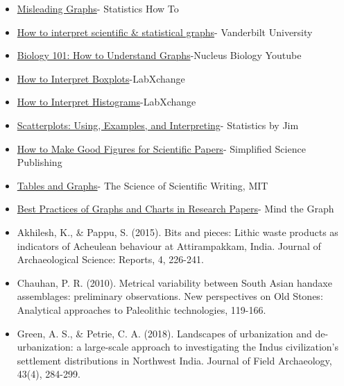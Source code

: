 \documentclass{article}
\begin{document}
\begin{itemize}
    \item \href{https://www.statisticshowto.com/probability-and-statistics/descriptive-statistics/misleading-graphs/}{Misleading Graphs}- Statistics How To
    \item \href{https://biostat.app.vumc.org/wiki/pub/Main/TheresaScott/Interpret.Graphs.TAScott.handout.pdf}{How to interpret scientific \& statistical graphs}- Vanderbilt University
    \item \href{https://www.youtube.com/watch?v=JXejcX1nQs4}{Biology 101: How to Understand Graphs}-Nucleus Biology Youtube
    \item \href{https://www.labxchange.org/library/items/lb:LabXchange:d8863c77:html:1}{How to Interpret Boxplots}-LabXchange
    \item \href{https://www.labxchange.org/library/items/lb:LabXchange:10d3270e:html:1}{How to Interpret Histograms}-LabXchange
    \item \href{https://statisticsbyjim.com/graphs/scatterplots/}{Scatterplots: Using, Examples, and Interpreting}- Statistics by Jim
    \item \href{https://www.simplifiedsciencepublishing.com/resources/how-to-make-good-figures-for-scientific-papers}{How to Make Good Figures for Scientific Papers}- Simplified Science Publishing
    \item \href{https://web.mit.edu/7.021/www/lectures/TablesGraphs_MO.pdf}{Tables and Graphs}- The Science of Scientific Writing, MIT
    \item \href{https://mindthegraph.com/blog/graphs-charts-tips-research-paper/}{Best Practices of Graphs and Charts in Research Papers}- Mind the Graph
    \item  \hypertarget{pappu}{Akhilesh, K., \& Pappu, S. (2015). Bits and pieces: Lithic waste products as indicators of Acheulean behaviour at Attirampakkam, India. Journal of Archaeological Science: Reports, 4, 226-241.}
    \item\hypertarget{chauhan}{Chauhan, P. R. (2010). Metrical variability between South Asian handaxe assemblages: preliminary observations. New perspectives on Old Stones: Analytical approaches to Paleolithic technologies, 119-166.}
    \item \hypertarget{univariate_plot}{Green, A. S., \& Petrie, C. A. (2018). Landscapes of urbanization and de-urbanization: a large-scale approach to investigating the Indus civilization’s settlement distributions in Northwest India. Journal of Field Archaeology, 43(4), 284-299.}

\end{itemize}
\end{document}
